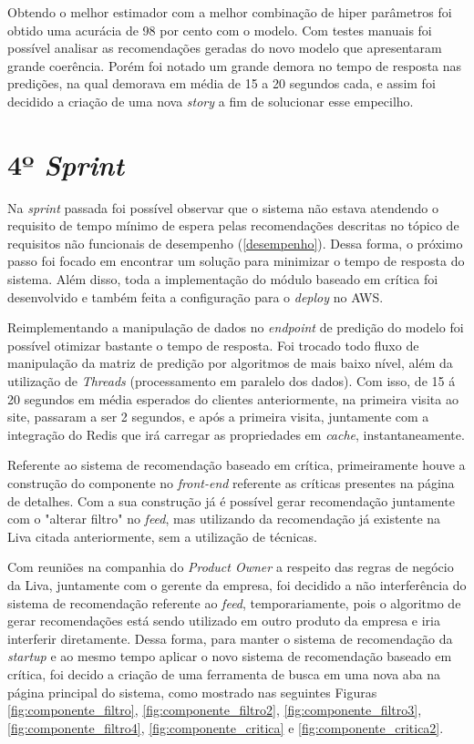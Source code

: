 Obtendo o melhor estimador com a melhor combinação de hiper parâmetros foi obtido uma acurácia de 98 por cento com o modelo. Com testes manuais foi possível analisar as recomendações geradas do novo modelo que apresentaram grande coerência. Porém foi notado um grande demora no tempo de resposta nas predições, na qual demorava em média de 15 a 20 segundos cada, e assim foi decidido a criação de uma nova \textit{story} a fim de solucionar esse empecilho.


\section{4º \textit{Sprint}}

Na \textit{sprint} passada foi possível observar que o sistema não estava atendendo o requisito de tempo mínimo de espera pelas recomendações descritas no tópico de requisitos não funcionais de desempenho (\ref{desempenho}). Dessa forma, o próximo passo foi focado em encontrar um solução para minimizar o tempo de resposta do sistema. Além disso, toda a implementação do módulo baseado em crítica foi desenvolvido e também feita a configuração para o \textit{deploy} no AWS.

Reimplementando a manipulação de dados no \textit{endpoint} de predição do modelo foi possível otimizar bastante o tempo de resposta. Foi trocado todo fluxo de manipulação da matriz de predição por algoritmos de mais baixo nível, além da utilização de \textit{Threads} (processamento em paralelo dos dados). Com isso, de 15 á 20 segundos em média esperados do clientes anteriormente, na primeira visita ao site, passaram a ser 2 segundos, e após a primeira visita, juntamente com a integração do Redis que irá carregar as propriedades em \textit{cache}, instantaneamente.

Referente ao sistema de recomendação baseado em crítica, primeiramente houve a construção do componente no \textit{front-end} referente as críticas presentes na página de detalhes. Com a sua construção já é possível gerar recomendação juntamente com o "alterar filtro" no \textit{feed}, mas utilizando da recomendação já existente na Liva citada anteriormente, sem a utilização de técnicas.

Com reuniões na companhia do \textit{Product Owner} a respeito das regras de negócio da Liva, juntamente com o gerente da empresa, foi decidido a não interferência do sistema de recomendação referente ao \textit{feed}, temporariamente, pois o algoritmo de gerar recomendações está sendo utilizado em outro produto da empresa e iria interferir diretamente. Dessa forma, para manter o sistema de recomendação da \textit{startup} e ao mesmo tempo aplicar o novo sistema de recomendação baseado em crítica, foi decido a criação de uma ferramenta de busca em uma nova aba na página principal do sistema, como mostrado nas seguintes Figuras \ref{fig:componente_filtro}, \ref{fig:componente_filtro2}, \ref{fig:componente_filtro3}, \ref{fig:componente_filtro4}, \ref{fig:componente_critica} e \ref{fig:componente_critica2}.


